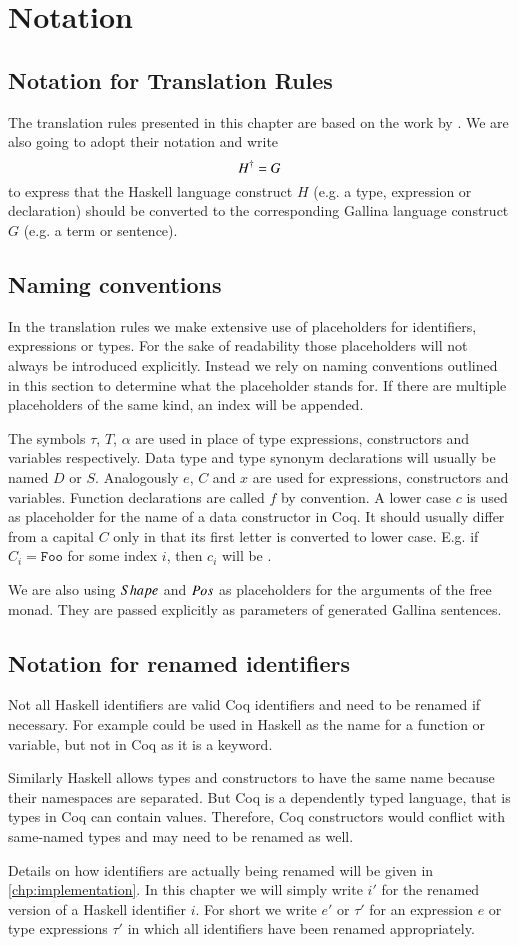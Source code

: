\section{Notation} \label{sec:translation:notation}
\subsection{Notation for Translation Rules}
The translation rules presented in this chapter are based on the work by \cite{Abel:2005}.
We are also going to adopt their notation and write
\[
  {H}^{\dagger} = G
\]
to express that the Haskell language construct $H$ (e.g. a type, expression or declaration) should be converted to the corresponding Gallina language construct $G$ (e.g. a term or sentence).

\subsection{Naming conventions}
In the translation rules we make extensive use of placeholders for identifiers, expressions or types.
For the sake of readability those placeholders will not always be introduced explicitly.
Instead we rely on naming conventions outlined in this section to determine what the placeholder stands for.
If there are multiple placeholders of the same kind, an index will be appended.

The symbols $\tau$, $T$, $\alpha$ are used in place of type expressions, constructors and variables respectively.
Data type and type synonym declarations will usually be named $D$ or $S$.
Analogously $e$, $C$ and $x$ are used for expressions, constructors and variables.
Function declarations are called $f$ by convention.
A lower case $c$ is used as placeholder for the name of a data constructor in Coq.
It should usually differ from a capital $C$ only in that its first letter is converted to lower case.
E.g. if $C_i = \texttt{Foo}$ for some index $i$, then $c_i$ will be .

We are also using $Shape$ and $Pos$ as placeholders for the arguments of the free monad.
They are passed explicitly as parameters of generated Gallina sentences.

\subsection{Notation for renamed identifiers}
Not all Haskell identifiers are valid Coq identifiers and need to be renamed if necessary.
For example  could be used in Haskell as the name for a function or variable, but not in Coq as it is a keyword.

Similarly Haskell allows types and constructors to have the same name because their namespaces are separated.
But Coq is a dependently typed language, that is types in Coq can contain values.
Therefore, Coq constructors would conflict with same-named types and may need to be renamed as well.

Details on how identifiers are actually being renamed will be given in \autoref{chp:implementation}.
In this chapter we will simply write $i'$ for the renamed version of a Haskell identifier $i$.
For short we write $e'$ or $\tau'$ for an expression $e$ or type expressions $\tau'$ in which all identifiers have been renamed appropriately.
